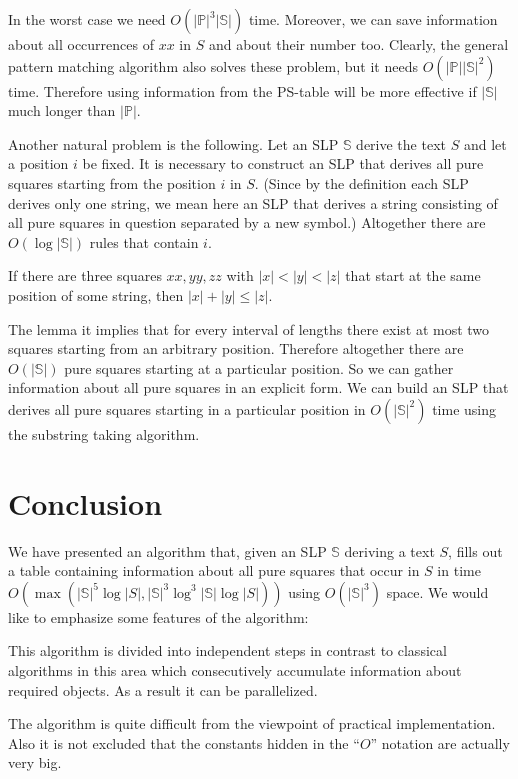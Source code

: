 \documentclass[11pt]{article}
\begin{document}
In the worst case we need $O(|\mathbb{P}|^3|\mathbb{S}|)$ time.
Moreover, we can save information about all occurrences of $xx$ in
$S$ and about their number too. Clearly, the general pattern
matching algorithm also solves these problem, but it needs
$O(|\mathbb{P}||\mathbb{S}|^2)$ time. Therefore using information
from the PS-table will be more effective if $|\mathbb{S}|$ much
longer than $|\mathbb{P}|$.

Another natural problem is the following. Let an SLP $\mathbb{S}$
derive the text $S$ and let a position $i$ be fixed. It is
necessary to construct an SLP that derives all pure squares
starting from the position $i$ in $S$. (Since by the definition
each SLP derives only one string, we mean here an SLP that derives
a string consisting of all pure squares in question separated by a
new symbol.)  Altogether there are $O(\log|\mathbb{S}|)$ rules
that contain $i$.

\begin{lem}[{\rm\cite{11}}]
If there are three squares $xx, yy, zz$ with $|x| < |y| < |z|$
that start at the same position of some string,
then $|x| + |y| \leq |z|$.
\end{lem}

The lemma it implies that for every interval of lengths there
exist at most two squares starting from an arbitrary position.
Therefore altogether there are $O(|\mathbb{S}|)$ pure squares
starting at a particular position. So we can gather information
about all pure squares in an explicit form. We can build an SLP
that derives all pure squares starting in a particular position in
$O(|\mathbb{S}|^2)$ time using the substring taking algorithm.

\section{Conclusion}

We have presented an algorithm that, given an SLP $\mathbb{S}$
deriving a text $S$, fills out a table containing information
about all pure squares that occur in $S$ in time
$O(\max(|\mathbb{S}|^5\log|S|,
|\mathbb{S}|^3\log^3|\mathbb{S}|\log|S|))$ using
$O(|\mathbb{S}|^3)$ space. We would like to emphasize some
features of the algorithm:

\begin{itemize}
\begin{item}
This algorithm is divided into independent steps in contrast to classical algorithms in this area which
consecutively accumulate information about required objects. As a result it can be parallelized.
\end{item}
\begin{item}
The algorithm is quite difficult from the viewpoint of practical implementation. Also it is not excluded that
the constants hidden in the ``$O$'' notation  are actually very big.
\end{item}
\end{itemize}
\end{document}
